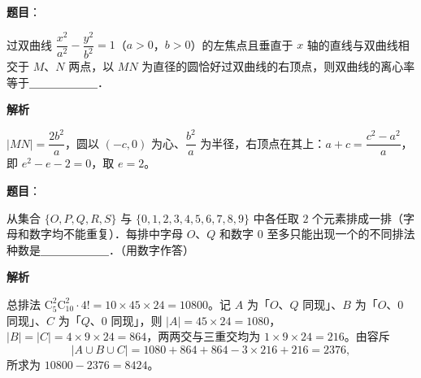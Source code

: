 \begin{answer}

\textbf{题目}：

过双曲线 $\dfrac{x^2}{a^2} - \dfrac{y^2}{b^2} = 1$（$a > 0$，$b > 0$）的左焦点且垂直于 $x$ 轴的直线与双曲线相交于 $M$、$N$ 两点，以 $MN$ 为直径的圆恰好过双曲线的右顶点，则双曲线的离心率等于＿＿＿＿＿＿．

\textbf{解析}

$|MN| = \dfrac{2b^2}{a}$，圆以 $(-c, 0)$ 为心、$\dfrac{b^2}{a}$ 为半径，右顶点在其上：$a + c = \dfrac{c^2 - a^2}{a}$，即 $e^2 - e - 2 = 0$，取 $e = 2$。


\end{answer}
\begin{answer}

\textbf{题目}：

从集合 $\{O, P, Q, R, S\}$ 与 $\{0, 1, 2, 3, 4, 5, 6, 7, 8, 9\}$ 中各任取 $2$ 个元素排成一排（字母和数字均不能重复）．每排中字母 $O$、$Q$ 和数字 $0$ 至多只能出现一个的不同排法种数是＿＿＿＿＿＿．（用数字作答）

\textbf{解析}

总排法 $\mathrm{C}_5^2\mathrm{C}_{10}^2 \cdot 4! = 10 \times 45 \times 24 = 10800$。记 $A$ 为「$O$、$Q$ 同现」、$B$ 为「$O$、$0$ 同现」、$C$ 为「$Q$、$0$ 同现」，则 $|A| = 45 \times 24 = 1080$，$|B| = |C| = 4 \times 9 \times 24 = 864$，两两交与三重交均为 $1 \times 9 \times 24 = 216$。由容斥
\nopagebreak[4]
\[
|A \cup B \cup C| = 1080 + 864 + 864 - 3 \times 216 + 216 = 2376,
\]
所求为 $10800 - 2376 = 8424$。


\end{answer}
